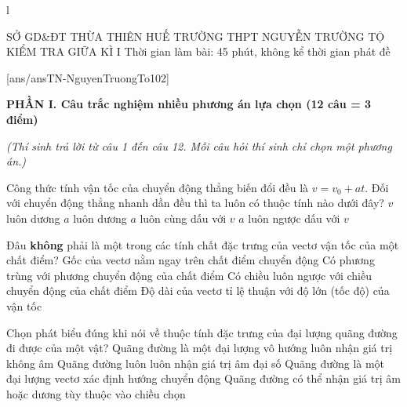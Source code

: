 l%
\def\toanlop{10}
\def\thoigian{45}
\def\namhoc{2024 - 2025}
\begin{dethi}
	{SỞ GD\&ĐT THỪA THIÊN HUẾ}
	{TRƯỜNG THPT NGUYỄN TRƯỜNG TỘ}
	{KIỂM TRA GIỮA KÌ I}
	{Thời gian làm bài: 45 phút, không kể thời gian phát đề}
\end{dethi}

[ans/ansTN-NguyenTruongTo102]

\noindent \textbf{PHẦN I. Câu trắc nghiệm nhiều phương án lựa chọn (12 câu = 3 điểm)}

\noindent \textit{(Thí sinh trả lời từ câu 1 đến câu 12. Mỗi câu hỏi thí sinh chỉ chọn một phương án.)}
\vspace{0.2cm}

\begin{ex}%
	Công thức tính vận tốc của chuyển động thẳng biến đổi đều là $v=v_{0}+at$. Đối với chuyển động thẳng nhanh dần đều thì ta luôn có thuộc tính nào dưới đây?
	\choice
	{$v$ luôn dương}
	{$a$ luôn dương}
	{\True $a$ luôn cùng dấu với $v$}
	{$a$ luôn ngược dấu với $v$}
\end{ex}

\begin{ex}%
	Đâu \textbf{không} phải là một trong các tính chất đặc trưng của vectơ vận tốc của một chất điểm?
	\choice
	{Gốc của vectơ nằm ngay trên chất điểm chuyển động}
	{Có phương trùng với phương chuyển động của chất điểm}
	{\True Có chiều luôn ngược với chiều chuyển động của chất điểm}
	{Độ dài của vectơ tỉ lệ thuận với độ lớn (tốc độ) của vận tốc}
\end{ex}

\begin{ex}%
	Chọn phát biểu đúng khi nói về thuộc tính đặc trưng của đại lượng quãng đường đi được của một vật?
	\choice
	{\True Quãng đường là một đại lượng vô hướng luôn nhận giá trị không âm}
	{Quãng đường luôn luôn nhận giá trị âm đại số}
	{Quãng đường là một đại lượng vectơ xác định hướng chuyển động}
	{Quãng đường có thể nhận giá trị âm hoặc dương tùy thuộc vào chiều chọn}
\end{ex}


